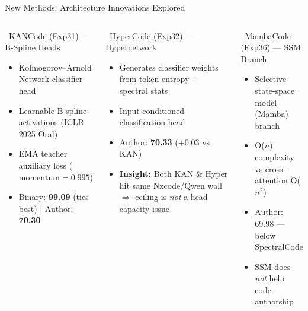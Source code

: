 \documentclass[aspectratio=169, 10pt]{beamer}
\begin{document}
\begin{frame}{New Methods: Architecture Innovations Explored}
\vspace{-0.15cm}
\begin{columns}[T]
\begin{block}{\faStar\ KANCode (Exp31) --- B-Spline Heads}
\small
\begin{itemize}\setlength\itemsep{2pt}
    \item Kolmogorov--Arnold Network classifier head
    \item Learnable B-spline activations (ICLR 2025 Oral)
    \item EMA teacher auxiliary loss ($\text{momentum}=0.995$)
    \item Binary: \textbf{99.09} (ties best) | Author: \textbf{70.30}
\end{itemize}
\end{block}

\begin{block}{\faStar\ HyperCode (Exp32) --- Hypernetwork}
\small
\begin{itemize}\setlength\itemsep{2pt}
    \item Generates classifier weights from token entropy + spectral stats
    \item Input-conditioned classification head
    \item Author: \textbf{70.33} (+0.03 vs KAN)
    \item[\faArrowRight] \textbf{Insight:} Both KAN \& Hyper hit same Nxcode/Qwen wall $\Rightarrow$ ceiling is \emph{not} a head capacity issue
\end{itemize}
\end{block}

\begin{block}{\faStar\ MambaCode (Exp36) --- SSM Branch}
\small
\begin{itemize}\setlength\itemsep{2pt}
    \item Selective state-space model (Mamba) branch
    \item O($n$) complexity vs cross-attention O($n^2$)
    \item Author: 69.98 --- below SpectralCode
    \item[\faArrowRight] SSM does \emph{not} help code authorship
\end{itemize}
\end{block}


\end{columns}
\end{frame}
\end{document}
